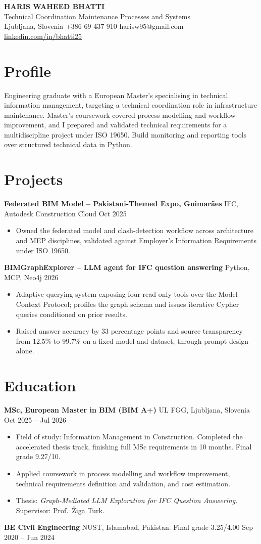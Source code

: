 \documentclass[a4paper,10.5pt]{article}
\newcommand{\datefill}{\dotfill}
\newcommand{\entry}[3]{\vspace{2.5pt}\noindent\textbf{#1} \textbar{} #2 \datefill{} #3\par\vspace{0.5pt}}
\newcommand{\ROLELINE}{Technical Coordination \textbar{} Maintenance Processes and Systems}
\newcommand{\projBIMGraph}{%
\entry{BIMGraphExplorer -- LLM agent for IFC question answering}{Python, MCP, Neo4j}{2026}
\begin{itemize}
  \item Adaptive querying system exposing four read-only tools over the Model
        Context Protocol; profiles the graph schema and issues iterative Cypher
        queries conditioned on prior results.
  \item Raised answer accuracy by 33 percentage points and source transparency from
        12.5\% to 99.7\% on a fixed model and dataset, through prompt design alone.
\end{itemize}}
\newcommand{\projGuimaraes}{%
\entry{Federated BIM Model -- Pakistani-Themed Expo, Guimar\~aes}{IFC, Autodesk Construction Cloud}{Oct 2025}
\begin{itemize}
  \item Owned the federated model and clash-detection workflow across architecture
        and MEP disciplines, validated against Employer's Information Requirements
        under ISO 19650.
\end{itemize}}
\begin{document}
\begin{center}
  {\LARGE\bfseries HARIS WAHEED BHATTI}\\[2pt]
  {\large \ROLELINE}\\[3pt]
  Ljubljana, Slovenia \textbar{} +386 69 437 910 \textbar{} harisw95@gmail.com\\
  \href{https://linkedin.com/in/bhatti25}{linkedin.com/in/bhatti25}
\end{center}
\vspace{-4pt}

\section{Profile}

\noindent Engineering graduate with a European Master's specialising in technical
information management, targeting a technical coordination role in infrastructure
maintenance. Master's coursework covered process modelling and workflow improvement,
and I prepared and validated technical requirements for a multidiscipline project
under ISO 19650. Build monitoring and reporting tools over structured technical data
in Python.

\section{Projects}

 \projGuimaraes \projBIMGraph

\section{Education}
\entry{MSc, European Master in BIM (BIM A+)}{UL FGG, Ljubljana, Slovenia}{Oct 2025 -- Jul 2026}
\begin{itemize}
  \item Field of study: Information Management in Construction. Completed the
        accelerated thesis track, finishing full MSc requirements in 10 months.
        Final grade 9.27/10.
  \item Applied coursework in process modelling and workflow improvement, technical
        requirements definition and validation, and cost estimation.
  \item Thesis: \textit{Graph-Mediated LLM Exploration for IFC Question Answering}.
        Supervisor: Prof.~\v{Z}iga Turk.
\end{itemize}

\entry{BE Civil Engineering}{NUST, Islamabad, Pakistan. Final grade 3.25/4.00}{Sep 2020 -- Jun 2024}
\end{document}
